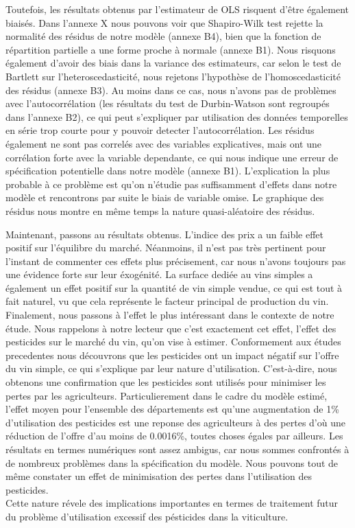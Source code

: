 \documentclass[11pt,]{article}
\begin{document}
Toutefois, les résultats obtenus par l'estimateur de OLS risquent d'être
également biaisés. Dans l'annexe X nous pouvons voir que Shapiro-Wilk
test rejette la normalité des résidus de notre modèle (annexe B4), bien
que la fonction de répartition partielle a une forme proche à normale
(annexe B1). Nous risquons également d'avoir des biais dans la variance
des estimateurs, car selon le test de Bartlett sur l'heteroscedasticité,
nous rejetons l'hypothèse de l'homoscedasticité des résidus (annexe B3).
Au moins dans ce cas, nous n'avons pas de problèmes avec
l'autocorrélation (les résultats du test de Durbin-Watson sont regroupés
dans l'annexe B2), ce qui peut s'expliquer par utilisation des données
temporelles en série trop courte pour y pouvoir detecter
l'autocorrélation. Les résidus également ne sont pas correlés avec des
variables explicatives, mais ont une corrélation forte avec la variable
dependante, ce qui nous indique une erreur de spécification potentielle
dans notre modèle (annexe B1). L'explication la plus probable à ce
problème est qu'on n'étudie pas suffisamment d'effets dans notre modèle
et rencontrons par suite le biais de variable omise. Le graphique des
résidus nous montre en même temps la nature quasi-aléatoire des résidus.

Maintenant, passons au résultats obtenus. L'indice des prix a un faible
effet positif sur l'équilibre du marché. Néanmoins, il n'est pas très
pertinent pour l'instant de commenter ces effets plus précisement, car
nous n'avons toujours pas une évidence forte sur leur éxogénité. La
surface dediée au vins simples a également un effet positif sur la
quantité de vin simple vendue, ce qui est tout à fait naturel, vu que
cela représente le facteur principal de production du vin. Finalement,
nous passons à l'effet le plus intéressant dans le contexte de notre
étude. Nous rappelons à notre lecteur que c'est exactement cet effet,
l'effet des pesticides sur le marché du vin, qu'on vise à estimer.
Conformement aux études precedentes nous découvrons que les pesticides
ont un impact négatif sur l'offre du vin simple, ce qui s'explique par
leur nature d'utilisation. C'est-à-dire, nous obtenons une confirmation
que les pesticides sont utilisés pour minimiser les pertes par les
agriculteurs. Particulierement dans le cadre du modèle estimé, l'effet
moyen pour l'ensemble des départements est qu'une augmentation de 1\%
d'utilisation des pesticides est une reponse des agriculteurs à des
pertes d'où une réduction de l'offre d'au moins de 0.0016\%, toutes
choses égales par ailleurs. Les résultats en termes numériques sont
assez ambigus, car nous sommes confrontés à de nombreux problèmes dans
la spécification du modèle. Nous pouvons tout de même constater un effet
de minimisation des pertes dans l'utilisation des pesticides.\\
Cette nature révele des implications importantes en termes de traitement
futur du problème d'utilisation excessif des pésticides dans la
viticulture.
\end{document}
